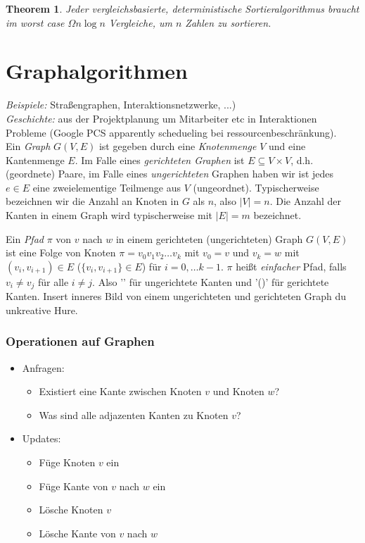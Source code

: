 \documentclass{article}
\newtheorem{thm}{Theorem}[section]
\begin{document}
\begin{thm}
Jeder vergleichsbasierte, deterministische Sortieralgorithmus braucht im worst case $\Omega{n\log n}$ Vergleiche, um
$n$ Zahlen zu sortieren.
\end{thm}




\section{Graphalgorithmen}
\textit{Beispiele: } Straßengraphen, Interaktionsnetzwerke, ...)\\
\textit{Geschichte:} aus der Projektplanung um Mitarbeiter etc in Interaktionen Probleme (Google PCS apparently schedueling bei ressourcenbeschränkung).\\
Ein \emph{Graph} $G(V,E)$ ist gegeben durch eine \emph{Knotenmenge} $V$ und eine Kantenmenge $E$. Im Falle eines
\emph{gerichteten Graphen} ist $E\subseteq V\times V$, d.h. (geordnete) Paare, im Falle eines \emph{ungerichteten} Graphen
haben wir ist jedes $e\in E$ eine zweielementige Teilmenge aus $V$ (ungeordnet).
Typischerweise bezeichnen wir die Anzahl an Knoten in $G$ als $n$, also $|V|=n$. Die Anzahl der Kanten in einem Graph
wird typischerweise mit $|E|=m$ bezeichnet.

Ein \emph{Pfad} $\pi$ von $v$ nach $w$ in einem gerichteten (ungerichteten) Graph $G(V,E)$ ist eine Folge von Knoten
$\pi=v_0v_1v_2\dots v_k$ mit $v_0=v$ und $v_k=w$ mit $(v_i, v_{i+1})\in E$ ($\{v_i, v_{i+1}\}\in E$) für $i=0,\dots k-1$. 
$\pi$ heißt \emph{einfacher} Pfad, falls $v_i\neq v_j$ für alle $i\neq j$.
Also '{}' für ungerichtete Kanten und '()' für gerichtete Kanten.
Insert inneres Bild von einem ungerichteten und gerichteten Graph  du unkreative Hure.\\
\subsubsection{Operationen auf Graphen}
\begin{itemize}
\item Anfragen:
	\begin{itemize}
	\item Existiert eine Kante zwischen Knoten $v$ und Knoten $w$?
	\item Was sind alle adjazenten Kanten zu Knoten $v$?
	\end{itemize}
\item Updates:
	\begin{itemize}
	\item Füge Knoten $v$ ein
	\item Füge Kante von $v$ nach $w$ ein
	\item Lösche Knoten $v$
	\item Lösche Kante von $v$ nach $w$
	\end{itemize}
\end{itemize}
\end{document}
